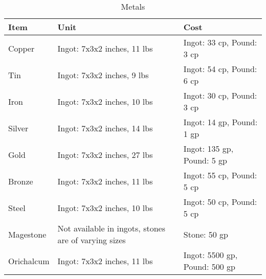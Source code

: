 \documentclass[oneside,11pt,english]{book}
\begin{document}
\begin{table}[hb]
  \centering
  \caption{Metals}
  \label{tab:Metals}
  \begin{tabu} spread 0pt {*{3}{X[-1]}}
    Item       & Unit                                                 & Cost                          \\\toprule
    Copper     & Ingot: 7x3x2 inches, 11 lbs                          & Ingot: 33 cp, Pound: 3 cp     \\
    Tin        & Ingot: 7x3x2 inches, 9 lbs                           & Ingot: 54 cp, Pound: 6 cp     \\
    Iron       & Ingot: 7x3x2 inches, 10 lbs                          & Ingot: 30 cp, Pound: 3 cp     \\
    Silver     & Ingot: 7x3x2 inches, 14 lbs                          & Ingot: 14 gp, Pound: 1 gp     \\
    Gold       & Ingot: 7x3x2 inches, 27 lbs                          & Ingot: 135 gp, Pound: 5 gp    \\
    Bronze     & Ingot: 7x3x2 inches, 11 lbs                          & Ingot: 55 cp, Pound: 5 cp     \\
    Steel      & Ingot: 7x3x2 inches, 10 lbs                          & Ingot: 50 cp, Pound: 5 cp     \\
    Magestone  & Not available in ingots, stones are of varying sizes & Stone: 50 gp                  \\
    Orichalcum & Ingot: 7x3x2 inches, 11 lbs                          & Ingot: 5500 gp, Pound: 500 gp \\
  \end{tabu}
\end{table}
\end{document}
